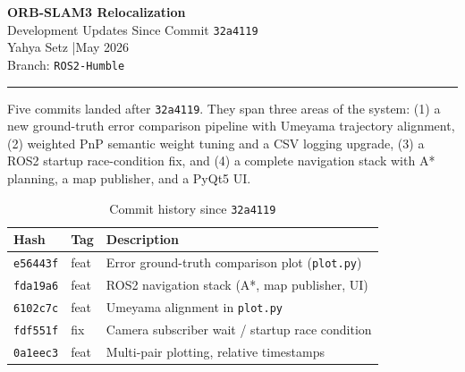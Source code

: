 \documentclass[11pt,a4paper]{article}
\begin{document}
\begin{center}
  {\LARGE\bfseries\color{primary} ORB-SLAM3 Relocalization}\\[6pt]
  {\large Development Updates Since Commit \texttt{32a4119}}\\[10pt]
  {\normalsize Yahya Setz \quad|\quad May 2026}\\[4pt]
  {\small\color{gray} Branch: \texttt{ROS2-Humble}}
\end{center}

\vspace{0.5em}
\noindent\color{primary}\rule{\textwidth}{1.5pt}
\vspace{1em}

\begin{tcolorbox}[colback=primary!6, colframe=primary, fonttitle=\bfseries,
  title={Summary of Changes}]
Five commits landed after \texttt{32a4119}. They span three areas of the
system: (1) a new ground-truth error comparison pipeline with Umeyama trajectory
alignment, (2) weighted PnP semantic weight tuning and a CSV logging upgrade,
(3) a ROS2 startup race-condition fix, and (4) a complete navigation stack with
A* planning, a map publisher, and a PyQt5 UI.
\end{tcolorbox}

\vspace{0.5em}

\begin{table}[H]
\centering
\caption{Commit history since \texttt{32a4119}}
\begin{tabularx}{\textwidth}{@{}l l X@{}}
\toprule
\textbf{Hash} & \textbf{Tag} & \textbf{Description} \\
\midrule
\texttt{e56443f} & feat & Error ground-truth comparison plot (\texttt{plot.py}) \\
\texttt{fda19a6} & feat & ROS2 navigation stack (A*, map publisher, UI) \\
\texttt{6102c7c} & feat & Umeyama alignment in \texttt{plot.py} \\
\texttt{fdf551f} & fix  & Camera subscriber wait / startup race condition \\
\texttt{0a1eec3} & feat & Multi-pair plotting, relative timestamps \\
\bottomrule
\end{tabularx}
\end{table}
\end{document}

